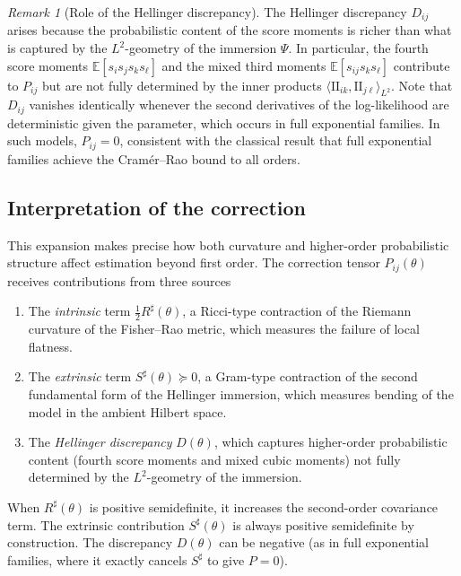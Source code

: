 \documentclass[11pt,letterpaper]{amsart}
\numberwithin{equation}{section}
\theoremstyle{plain}
\theoremstyle{definition}
\theoremstyle{remark}
\newtheorem{remark}[theorem]{Remark}
\begin{document}
\begin{remark}[Role of the Hellinger discrepancy]
\label{rem:discrepancy}
The Hellinger discrepancy \(D_{ij}\) arises because the probabilistic content of the score moments is richer than what is captured by the \(L^2\)-geometry of the immersion \(\Psi\). In particular, the fourth score moments \(\mathbb E[s_i s_j s_k s_\ell]\) and the mixed third moments \(\mathbb E[s_{ij}s_k s_\ell]\) contribute to \(P_{ij}\) but are not fully determined by the inner products \(\langle \mathrm{II}_{ik}, \mathrm{II}_{j\ell}\rangle_{L^2}\). Note that \(D_{ij}\) vanishes identically whenever the second derivatives of the log-likelihood are deterministic given the parameter, which occurs in full exponential families. In such models, \(P_{ij}=0\), consistent with the classical result that full exponential families achieve the Cram\'er--Rao bound to all orders.
\end{remark}

\subsection{Interpretation of the correction}

This expansion makes precise how both curvature and higher-order probabilistic structure affect estimation beyond first order. The correction tensor \(P_{ij}(\theta)\) receives contributions from three sources
\begin{enumerate}
\item The \emph{intrinsic} term \(\frac12 R^\sharp(\theta)\), a Ricci-type contraction of the Riemann curvature of the Fisher--Rao metric, which measures the failure of local flatness.
\item The \emph{extrinsic} term \(S^\sharp(\theta)\succeq 0\), a Gram-type contraction of the second fundamental form of the Hellinger immersion, which measures bending of the model in the ambient Hilbert space.
\item The \emph{Hellinger discrepancy} \(D(\theta)\), which captures higher-order probabilistic content (fourth score moments and mixed cubic moments) not fully determined by the \(L^2\)-geometry of the immersion.
\end{enumerate}

When \(R^\sharp(\theta)\) is positive semidefinite, it increases the second-order covariance term. The extrinsic contribution \(S^\sharp(\theta)\) is always positive semidefinite by construction. The discrepancy \(D(\theta)\) can be negative (as in full exponential families, where it exactly cancels \(S^\sharp\) to give \(P=0\)).
\end{document}
